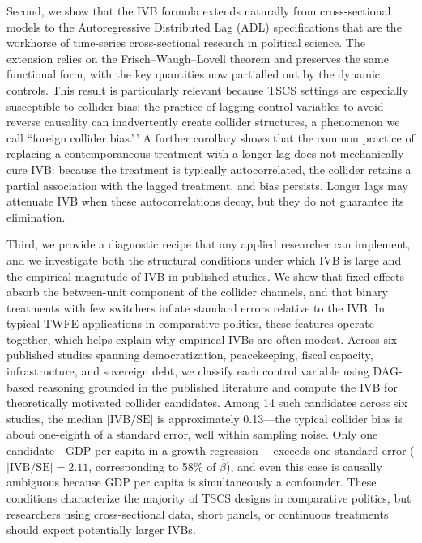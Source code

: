 \documentclass[
]{article}
\begin{document}
Second, we show that the IVB formula extends naturally from
cross-sectional models to the Autoregressive Distributed Lag (ADL)
specifications that are the workhorse of time-series cross-sectional
research in political science. The extension relies on the
Frisch--Waugh--Lovell theorem and preserves the same functional form,
with the key quantities now partialled out by the dynamic controls. This
result is particularly relevant because TSCS settings are especially
susceptible to collider bias: the practice of lagging control variables
to avoid reverse causality can inadvertently create collider structures,
a phenomenon we call ``foreign collider bias.'\,' A further corollary
shows that the common practice of replacing a contemporaneous treatment
with a longer lag does not mechanically cure IVB: because the treatment
is typically autocorrelated, the collider retains a partial association
with the lagged treatment, and bias persists. Longer lags may attenuate
IVB when these autocorrelations decay, but they do not guarantee its
elimination.

Third, we provide a diagnostic recipe that any applied researcher can
implement, and we investigate both the structural conditions under which
IVB is large and the empirical magnitude of IVB in published studies. We
show that fixed effects absorb the between-unit component of the
collider channels, and that binary treatments with few switchers inflate
standard errors relative to the IVB. In typical TWFE applications in
comparative politics, these features operate together, which helps
explain why empirical IVBs are often modest. Across six published
studies spanning democratization, peacekeeping, fiscal capacity,
infrastructure, and sovereign debt, we classify each control variable
using DAG-based reasoning grounded in the published literature and
compute the IVB for theoretically motivated collider candidates. Among
14 such candidates across six studies, the median
\(|\text{IVB}/\text{SE}|\) is approximately 0.13---the typical collider
bias is about one-eighth of a standard error, well within sampling
noise. Only one candidate---GDP per capita in a growth regression
\citep{rogowski_etal2022}---exceeds one standard error
(\(|\text{IVB}/\text{SE}| = 2.11\), corresponding to 58\% of
\(\hat\beta\)), and even this case is causally ambiguous because GDP per
capita is simultaneously a confounder. These conditions characterize the
majority of TSCS designs in comparative politics, but researchers using
cross-sectional data, short panels, or continuous treatments should
expect potentially larger IVBs.
\end{document}
